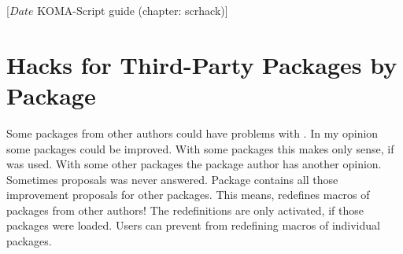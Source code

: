 %
%
%
%
%
%
%
%
% 
%
%
%
%

                 [$Date$
                  KOMA-Script guide (chapter: scrhack)]

\chapter{Hacks for Third-Party Packages by Package }

Some packages from other authors could have problems with \KOMAScript{}.  In my
opinion some packages could be improved. With some packages this makes only
sense, if \KOMAScript{} was used. With some other packages the package author
has another opinion. Sometimes proposals was never answered. Package
 contains all those improvement proposals for other
packages. This means,  redefines macros of packages from
other authors! The redefinitions are only activated, if those packages were
loaded. Users can prevent  from redefining macros of
individual packages.

